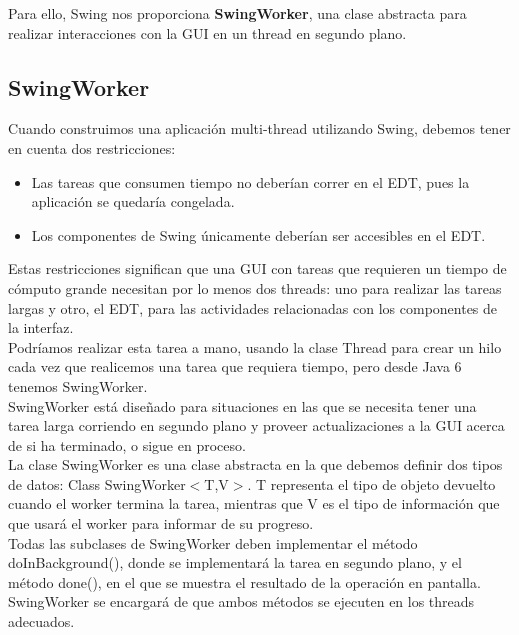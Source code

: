 \documentclass[12pt, a4paper]{book}
\begin{document}
Para ello, Swing nos proporciona \textbf{SwingWorker}, una clase abstracta para realizar interacciones con la \gls{GUI} en un thread en segundo plano.

\subsection{SwingWorker}

Cuando construimos una aplicación multi-thread utilizando Swing, debemos tener en cuenta dos restricciones:

\begin{itemize}
	\item Las tareas que consumen tiempo no deberían correr en el \gls{EDT}, pues la aplicación se quedaría congelada.
	\item Los componentes de Swing únicamente deberían ser accesibles en el \gls{EDT}.
\end{itemize}

Estas restricciones significan que una \gls{GUI} con tareas que requieren un tiempo de cómputo grande necesitan por lo menos dos threads: uno para realizar las tareas largas y otro, el \gls{EDT}, para las actividades relacionadas con los componentes de la interfaz.\\

Podríamos realizar esta tarea a mano, usando la clase Thread para crear un hilo cada vez que realicemos una tarea que requiera tiempo, pero desde Java 6 tenemos SwingWorker.\\

SwingWorker está diseñado para situaciones en las que se necesita tener una tarea larga corriendo en segundo plano y proveer actualizaciones a la \gls{GUI} acerca de si ha terminado, o sigue en proceso.\\

La clase SwingWorker es una clase abstracta en la que debemos definir dos tipos de datos: Class SwingWorker$<$T,V$>$. T representa el tipo de objeto devuelto cuando el worker termina la tarea, mientras que V es el tipo de información que que usará el worker para informar de su progreso.\\

Todas las subclases de SwingWorker deben implementar el método doInBackground(), donde se implementará la tarea en segundo plano, y el método done(), en el que se muestra el resultado de la operación en pantalla. SwingWorker se encargará de que ambos métodos se ejecuten en los threads adecuados.\\
\end{document}
